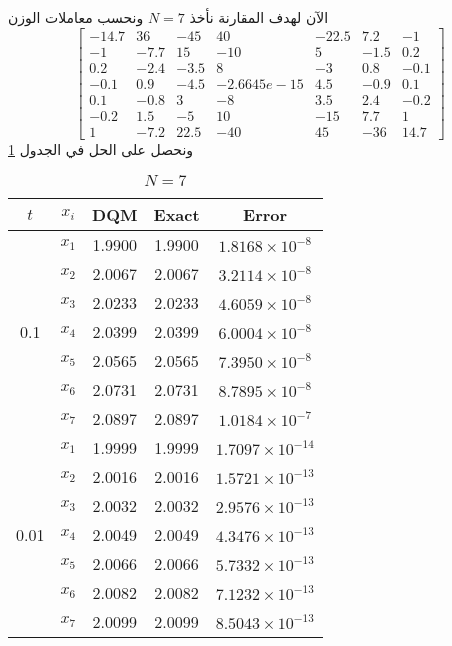 \begin{solution}
الآن لهدف المقارنة نأخذ $N=7$ ونحسب معاملات الوزن
\[
\begin{bmatrix}
	-14.7 & 36 & -45 & 40 & -22.5 & 7.2 & -1 \\
	-1 & -7.7 & 15 & -10 & 5 & -1.5 & 0.2 \\
	0.2 & -2.4 & -3.5 & 8 & -3 & 0.8 & -0.1 \\
	-0.1 & 0.9 & -4.5 & -2.6645e-15 & 4.5 & -0.9 & 0.1 \\
	0.1 & -0.8 & 3 & -8 & 3.5 & 2.4 & -0.2 \\
	-0.2 & 1.5 & -5 & 10 & -15 & 7.7 & 1 \\
	1 & -7.2 & 22.5 & -40 & 45 & -36 & 14.7
\end{bmatrix}
\]
ونحصل على الحل في الجدول \ref{tab:secondexN7}

	\begin{table}[h!]
		\centering
		\begin{english}
		\begin{tabular}{|c|c|c|c|c|}
			\hline
			$t$ & $x_i$ & DQM & Exact & Error \\
			\hline
			\multirow{7}{*}{0.1} & $x_1$ & 1.9900 & 1.9900 & $1.8168 \times 10^{-8}$ \\
			& $x_2$ & 2.0067 & 2.0067 & $3.2114 \times 10^{-8}$ \\
			& $x_3$ & 2.0233 & 2.0233 & $4.6059 \times 10^{-8}$ \\
			& $x_4$ & 2.0399 & 2.0399 & $6.0004 \times 10^{-8}$ \\
			& $x_5$ & 2.0565 & 2.0565 & $7.3950 \times 10^{-8}$ \\
			& $x_6$ & 2.0731 & 2.0731 & $8.7895 \times 10^{-8}$ \\
			& $x_7$ & 2.0897 & 2.0897 & $1.0184 \times 10^{-7}$ \\
			\hline
			\multirow{7}{*}{0.01} & $x_1$ & 1.9999 & 1.9999 & $1.7097 \times 10^{-14}$ \\
			& $x_2$ & 2.0016 & 2.0016 & $1.5721 \times 10^{-13}$ \\
			& $x_3$ & 2.0032 & 2.0032 & $2.9576 \times 10^{-13}$ \\
			& $x_4$ & 2.0049 & 2.0049 & $4.3476 \times 10^{-13}$ \\
			& $x_5$ & 2.0066 & 2.0066 & $5.7332 \times 10^{-13}$ \\
			& $x_6$ & 2.0082 & 2.0082 & $7.1232 \times 10^{-13}$ \\
			& $x_7$ & 2.0099 & 2.0099 & $8.5043 \times 10^{-13}$ \\
			\hline
		\end{tabular}
\end{english}
	\caption{$N=7$}
\label{tab:secondexN7}
	\end{table}
\end{solution}

